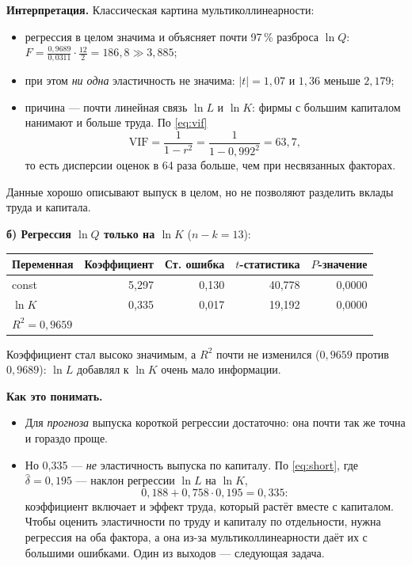\begin{solution}
\medskip
\textbf{Интерпретация.} Классическая картина мультиколлинеарности:
\begin{itemize}[leftmargin=2.2em, itemsep=2pt]
  \item регрессия в целом значима и объясняет почти 97\,\% разброса
        $\ln Q$: $F = \frac{0{,}9689}{0{,}0311}\cdot\frac{12}{2} = 186{,}8
        \gg 3{,}885$;
  \item при этом \emph{ни одна} эластичность не значима: $|t| = 1{,}07$ и
        $1{,}36$ меньше $2{,}179$;
  \item причина — почти линейная связь $\ln L$ и $\ln K$: фирмы с большим
        капиталом нанимают и больше труда. По \eqref{eq:vif}
        \[
          \mathrm{VIF} = \frac{1}{1 - r^2} = \frac{1}{1 - 0{,}992^2} = 63{,}7 ,
        \]
        то есть дисперсии оценок в 64 раза больше, чем при несвязанных
        факторах.
\end{itemize}
Данные хорошо описывают выпуск в целом, но не позволяют разделить вклады
труда и капитала.

\medskip
\textbf{б) Регрессия $\ln Q$ только на $\ln K$} ($n - k = 13$):
\begin{center}
\begin{tabular}{lrrrr}
\toprule
Переменная & Коэффициент & Ст. ошибка & $t$-статистика & $P$-значение \\
\midrule
const   & 5,297 & 0,130 & 40,778 & 0,0000 \\
$\ln K$ & 0,335 & 0,017 & 19,192 & 0,0000 \\
\midrule
\multicolumn{5}{l}{$R^2 = 0{,}9659$} \\
\bottomrule
\end{tabular}
\end{center}
Коэффициент стал высоко значимым, а $R^2$ почти не изменился
($0{,}9659$ против $0{,}9689$): $\ln L$ добавлял к $\ln K$ очень мало
информации.

\medskip
\textbf{Как это понимать.}
\begin{itemize}[leftmargin=2.2em, itemsep=2pt]
  \item Для \emph{прогноза} выпуска короткой регрессии достаточно: она почти
        так же точна и гораздо проще.
  \item Но 0,335 — \emph{не} эластичность выпуска по капиталу. По
        \eqref{eq:short}, где $\widehat{\delta} = 0{,}195$ — наклон регрессии
        $\ln L$ на $\ln K$,
        \[
          0{,}188 + 0{,}758\cdot 0{,}195 = 0{,}335 :
        \]
        коэффициент включает и эффект труда, который растёт вместе с
        капиталом. Чтобы оценить эластичности по труду и капиталу по
        отдельности, нужна регрессия на оба фактора, а она из-за
        мультиколлинеарности даёт их с большими ошибками. Один из выходов —
        следующая задача.
\end{itemize}
\end{solution}

